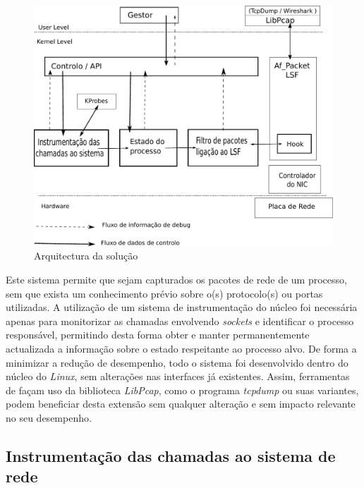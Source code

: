 \documentclass[a4paper]{llncs}
\begin{document}
\begin{figure}[htbp]
\begin{center}
\includegraphics[scale=0.5]{interface.pdf} 
\caption{Arquitectura da solução}
\label{arquitectura}
\end{center}
\end{figure}


Este sistema permite que sejam capturados os pacotes de rede de um processo, sem que exista um conhecimento prévio sobre o(s) protocolo(s) ou portas utilizadas. A utilização de um sistema de instrumentação do núcleo foi necessária apenas para monitorizar as chamadas envolvendo \emph{sockets} e identificar o processo responsável, permitindo desta forma obter e manter permanentemente actualizada a informação sobre o estado respeitante ao processo alvo. De forma a minimizar a redução de desempenho, todo o sistema foi desenvolvido dentro do núcleo do \textit{Linux}, sem alterações nas interfaces já existentes.  Assim, ferramentas de façam uso da biblioteca \textit{LibPcap}, como o programa \textit{tcpdump} ou suas variantes, podem beneficiar desta extensão sem qualquer alteração e sem impacto relevante no seu desempenho.



\subsection*{Instrumentação das chamadas ao sistema de rede}
\label{sub:mon_syscalls}
\end{document}
